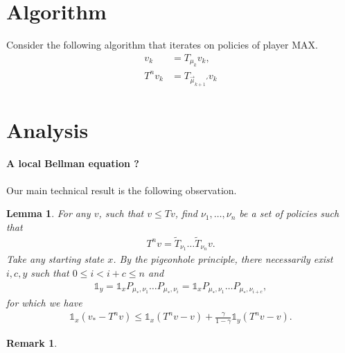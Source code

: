 \documentclass{article}
\newtheorem{lemma}{Lemma}
\newtheorem{remark}{Remark}
\def\1{{\mathds 1}}
\begin{document}
\section{Algorithm}

Consider the following algorithm that iterates on policies of player MAX.
\begin{align}
  v_k &= T_{\mu_k}v_k, \\
  T^{n} v_k &= T_{\vec\mu_{k+1}'} v_k
\end{align}


\section{Analysis}


\paragraph{A local Bellman equation ?}

Our main technical result is the following observation.
\begin{lemma}
  For any $v$, such that $v\le Tv$, find 
  $\nu_1,\dots,\nu_n$ be a set of policies such that
  \begin{align}
    T^n v = \tilde T_{\nu_1} \dots \tilde T_{\nu_n} v.
  \end{align}
  Take any starting state $x$. By the pigeonhole principle, there necessarily exist $i,c,y$ such that $0 \le i < i+c \le n$ and
  \begin{align}
    \1_y = \1_x P_{\mu_*,\nu_1} \dots P_{\mu_*,\nu_i} = \1_x P_{\mu_*,\nu_1} \dots P_{\mu_*,\nu_{i+c}},
  \end{align}
  for which we have
  \begin{align}
    \1_x (v_* - T^n v) \le \1_x (T^n v-v) + \frac{\gamma}{1-\gamma} \1_y(T^n v - v).
  \end{align}
\end{lemma}

\begin{remark}
  
\end{remark}
\end{document}
